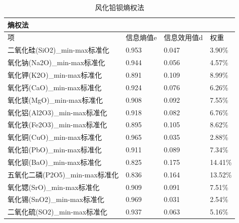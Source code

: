 \documentclass[UTF8]{ctexart}
\begin{document}
\begin{table}[H]
    \centering
    \caption{风化铅钡熵权法}
    \begin{tabular}{|l|l|l|l|}
        \hline
        熵权法                          & ~         & ~           & ~       \\ \hline
        项                              & 信息熵值e & 信息效用值d & 权重    \\ \hline
        二氧化硅(SiO2)\_min-max标准化   & 0.953     & 0.047       & 3.90\%  \\ \hline
        氧化钠(Na2O)\_min-max标准化     & 0.944     & 0.056       & 4.57\%  \\ \hline
        氧化钾(K2O)\_min-max标准化      & 0.891     & 0.109       & 8.99\%  \\ \hline
        氧化钙(CaO)\_min-max标准化      & 0.924     & 0.076       & 6.26\%  \\ \hline
        氧化镁(MgO)\_min-max标准化      & 0.908     & 0.092       & 7.55\%  \\ \hline
        氧化铝(Al2O3)\_min-max标准化    & 0.918     & 0.082       & 6.76\%  \\ \hline
        氧化铁(Fe2O3)\_min-max标准化    & 0.895     & 0.105       & 8.62\%  \\ \hline
        氧化铜(CuO)\_min-max标准化      & 0.965     & 0.035       & 2.88\%  \\ \hline
        氧化铅(PbO)\_min-max标准化      & 0.911     & 0.089       & 7.34\%  \\ \hline
        氧化钡(BaO)\_min-max标准化      & 0.825     & 0.175       & 14.41\% \\ \hline
        五氧化二磷(P2O5)\_min-max标准化 & 0.836     & 0.164       & 13.52\% \\ \hline
        氧化锶(SrO)\_min-max标准化      & 0.909     & 0.091       & 7.51\%  \\ \hline
        氧化锡(SnO2)\_min-max标准化     & 0.969     & 0.031       & 2.54\%  \\ \hline
        二氧化硫(SO2)\_min-max标准化    & 0.937     & 0.063       & 5.16\%  \\ \hline
    \end{tabular}
\end{table}
\end{document}
